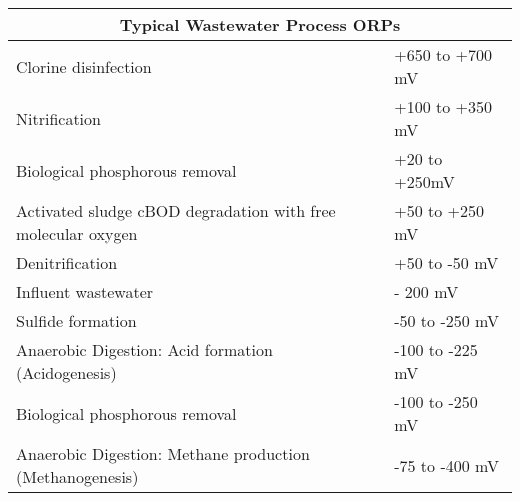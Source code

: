 			\setlength{\arrayrulewidth}{0.6mm}
			\setlength{\tabcolsep}{8 pt}
			\renewcommand{\arraystretch}{1.2}
			\begin{center}
			\begin{table}[!htbp]
				\begin{tabular}{ |p{9.5cm}|p{4.0cm}|}
					\hline
					\multicolumn{2}{|c|}{\textbf{Typical Wastewater Process ORPs}} \\
					\hline
					
					\hline
					\small Clorine disinfection & \small +650 to +700 mV  \\
					\small Nitrification & \small +100 to +350 mV   \\
					\small Biological phosphorous removal & \small +20 to +250mV        \\
					\small Activated sludge	cBOD degradation with free molecular oxygen & \small +50 to +250 mV  \\
					\small Denitrification                                              & \small +50 to -50 mV   \\
					\small Influent wastewater                                          & \small - 200 mV  \\ 
					\small Sulfide formation                                & \small -50 to -250 mV  \\
					\small Anaerobic Digestion: Acid formation (Acidogenesis)           & \small -100 to -225 mV \\
					\small Biological phosphorous removal & \small -100 to -250 mV \\
					\small Anaerobic Digestion: Methane production  (Methanogenesis)     & \small -75 to -400 mV  \\
					\hline
				\end{tabular}
	\end{table}			
			\end{center}
			
